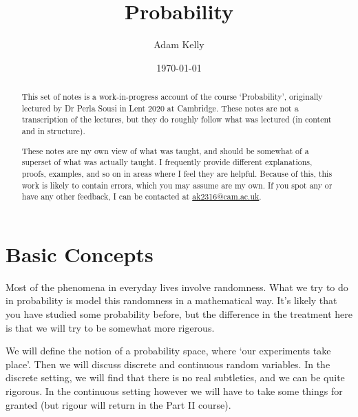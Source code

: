 \documentclass[a4paper]{scrreprt}
\title{Probability}
\author{Adam Kelly}
\date{\today}
\begin{document}
\maketitle

\begin{abstract}
	

	This set of notes is a work-in-progress account of the course `Probability', originally lectured by Dr Perla Sousi in Lent 2020 at Cambridge. These notes are not a transcription of the lectures, but they do roughly follow what was lectured (in content and in structure).

	These notes are my own view of what was taught, and should be somewhat of a superset of what was actually taught. I frequently provide different explanations, proofs, examples, and so on in areas where I feel they are helpful. Because of this, this work is likely to contain errors, which you may assume are my own. If you spot any or have any other feedback, I can be contacted at \href{mailto:ak2316@cam.ac.uk}{ak2316@cam.ac.uk}.



\end{abstract}

\tableofcontents

\clearpage

\chapter{Basic Concepts}

Most of the phenomena in everyday lives involve randomness. What we try to do in probability is model this randomness in a mathematical way. It's likely that you have studied some probability before, but the difference in the treatment here is that we will try to be somewhat more rigerous.

We will define the notion of a probability space, where `our experiments take place'. Then we will discuss discrete and continuous random variables. 
In the discrete setting, we will find that there is no real subtleties, and we can be quite rigorous. In the continuous setting however we will have to take some things for granted (but rigour will return in the Part II course).
\end{document}
